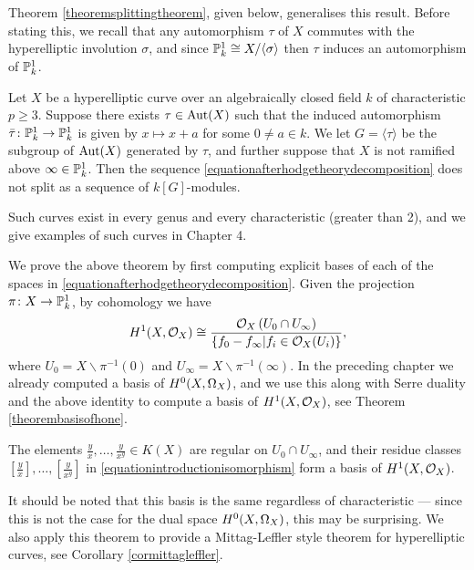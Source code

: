 Theorem \ref{theoremsplittingtheorem}, given below, generalises this result.
Before stating this, we recall that any automorphism $\tau$ of $X$ commutes with the hyperelliptic involution $\sigma$, and since ${\mathbb P}_k^1 \cong X/\langle \sigma \rangle$ then $\tau$ induces an automorphism of ${\mathbb P}_k^1$.
    \begin{unnumthm}
    Let $X$ be a hyperelliptic curve over an algebraically closed field $k$ of characteristic $p \geq 3$.
    Suppose there exists $\tau \in \operatorname{Aut}(X)$ such that the induced automorphism $\bar \tau \colon \mathbb P_k^1 \rightarrow \mathbb P_k^1$ is given by $x \mapsto x+a$ for some $0 \neq a \in k$.
    We let $G = \langle \tau \rangle$ be the subgroup of $\operatorname{Aut}(X)$ generated by $\tau$, and further suppose that $X$ is not ramified above $\infty \in {\mathbb P}_k^1$.
    Then the sequence \eqref{equationafterhodgetheorydecomposition} does not split as a sequence of $k[G]$-modules.
    \end{unnumthm}
Such curves exist in every genus and every characteristic (greater than 2), and we give examples of such curves in Chapter 4.%

We prove the above theorem by first computing explicit bases of each of the spaces in \eqref{equationafterhodgetheorydecomposition}.
Given the projection $\pi \colon X \rightarrow {\mathbb P}_k^1$, by \cech cohomology we have
        \begin{equation}\label{equationintroductionisomorphism}
        H^1(X,\mathcal{O}_X) \cong \frac{{\cal O}_X\left(U_0 \cap U_\infty\right)}{\{ f_0 - f_\infty | f_i \in {\cal O}_X(U_i)\}},
        \end{equation}
where $U_0 = X \backslash \pi^{-1}(0)$ and $U_\infty = X \backslash \pi^{-1}(\infty)$.
In the preceding chapter we already computed a basis of ${H^0(X,\Omega_X)}$, and we use this along with Serre duality and the above identity to compute a basis of $H^1(X,\mathcal{O}_X)$, see Theorem \ref{theorembasisofhone}.
    \begin{unnumthm}
    The elements $\frac{y}{x}, \ldots, \frac{y}{x^g} \in K(X)$ are regular on $U_0 \cap U_\infty$, and their residue classes $\left [ \frac{y}{x} \right ],  \ldots, \left [ \frac{y}{x^g} \right]$ in \eqref{equationintroductionisomorphism} form a basis of $H^1(X,\mathcal{O}_X)$.
    \end{unnumthm}
It should be noted that this basis is the same regardless of characteristic --- since this is not the case for the dual space ${H^0(X,\Omega_X)}$, this may be surprising.
We also apply this theorem to provide a Mittag-Leffler style theorem for hyperelliptic curves, see Corollary \ref{cormittagleffler}.

